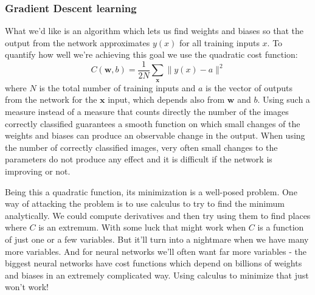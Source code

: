 \documentclass[12pt, letterpaper]{article}
\theoremstyle{definition}
\newcommand{\w}{\mathrm{\mathbf{w}}}
\newcommand{\x}{\mathbf{x}}
\begin{document}
\subsubsection{Gradient Descent learning}
What we'd like is an algorithm which lets us find weights and biases so that the output from the network approximates $y(x)$ for all training inputs $x$. To quantify how well we're achieving this goal we use the quadratic cost function:
\begin{equation}
C(\w, b) = \frac{1}{2N}\sum_\x \|y(x)-a \|^2
\end{equation}
where $N$ is the total number of training inputs and $a$ is the vector of outputs from the network for the $\x$ input, which depends also from $\w$ and $b$. Using such a measure instead of a measure that counts directly the number of the images correctly classified guarantees a smooth function on which small changes of the weights and biases can produce an observable change in the output. When using the number of correctly classified images, very often small changes to the parameters do not produce any effect and it is difficult if the network is improving or not.

Being this a quadratic function, its minimization is a well-posed problem. One way of attacking the problem is to use calculus to try to find the minimum analytically. We could compute derivatives and then try using them to find places where $C$ is an extremum. With some luck that might work when $C$ is a function of just one or a few variables. But it'll turn into a nightmare when we have many more variables. And for neural networks we'll often want far more variables - the biggest neural networks have cost functions which depend on billions of weights and biases in an extremely complicated way. Using calculus to minimize that just won't work!
\end{document}
